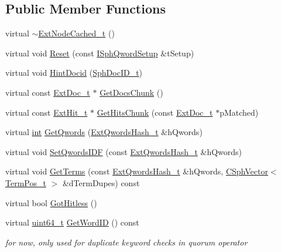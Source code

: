 \subsection*{Public Member Functions}
\begin{DoxyCompactItemize}
\item 
virtual \hyperlink{classExtNodeCached__t_aac40d1cb5a186e5c8782e7500b568504}{$\sim$\-Ext\-Node\-Cached\-\_\-t} ()
\item 
virtual void \hyperlink{classExtNodeCached__t_af392a1a331cce71b93215c15dcb3f6c2}{Reset} (const \hyperlink{classISphQwordSetup}{I\-Sph\-Qword\-Setup} \&t\-Setup)
\item 
virtual void \hyperlink{classExtNodeCached__t_a28e13f5745b43cc859eb8ff7bae78123}{Hint\-Docid} (\hyperlink{sphinx_8h_a3176771631c12a9e4897272003e6b447}{Sph\-Doc\-I\-D\-\_\-t})
\item 
virtual const \hyperlink{structExtDoc__t}{Ext\-Doc\-\_\-t} $\ast$ \hyperlink{classExtNodeCached__t_a3f16526caad3bd9e4a846db9007ea950}{Get\-Docs\-Chunk} ()
\item 
virtual const \hyperlink{structExtHit__t}{Ext\-Hit\-\_\-t} $\ast$ \hyperlink{classExtNodeCached__t_a0b357bc4f7153168b4919433a4ffb747}{Get\-Hits\-Chunk} (const \hyperlink{structExtDoc__t}{Ext\-Doc\-\_\-t} $\ast$p\-Matched)
\item 
virtual \hyperlink{sphinxexpr_8cpp_a4a26e8f9cb8b736e0c4cbf4d16de985e}{int} \hyperlink{classExtNodeCached__t_a27b6f6f3332973db08a9940edb7f5f5e}{Get\-Qwords} (\hyperlink{sphinxsearch_8cpp_a814fc096e1ffb29d072d79b72b702fe6}{Ext\-Qwords\-Hash\-\_\-t} \&h\-Qwords)
\item 
virtual void \hyperlink{classExtNodeCached__t_a261d7090726cbe7da5ce4df8164e454a}{Set\-Qwords\-I\-D\-F} (const \hyperlink{sphinxsearch_8cpp_a814fc096e1ffb29d072d79b72b702fe6}{Ext\-Qwords\-Hash\-\_\-t} \&h\-Qwords)
\item 
virtual void \hyperlink{classExtNodeCached__t_ac2e67b94bbcb2e9fedb750e707935d76}{Get\-Terms} (const \hyperlink{sphinxsearch_8cpp_a814fc096e1ffb29d072d79b72b702fe6}{Ext\-Qwords\-Hash\-\_\-t} \&h\-Qwords, \hyperlink{classCSphVector}{C\-Sph\-Vector}$<$ \hyperlink{structTermPos__t}{Term\-Pos\-\_\-t} $>$ \&d\-Term\-Dupes) const 
\item 
virtual bool \hyperlink{classExtNodeCached__t_ade6d4c065ef7fab6863e184c93e3c1f4}{Got\-Hitless} ()
\item 
virtual \hyperlink{sphinxstd_8h_aaa5d1cd013383c889537491c3cfd9aad}{uint64\-\_\-t} \hyperlink{classExtNodeCached__t_a6b575185e6a1a5e96463f6e914a0892d}{Get\-Word\-I\-D} () const 
\begin{DoxyCompactList}\small\item\em for now, only used for duplicate keyword checks in quorum operator \end{DoxyCompactList}\end{DoxyCompactItemize}
